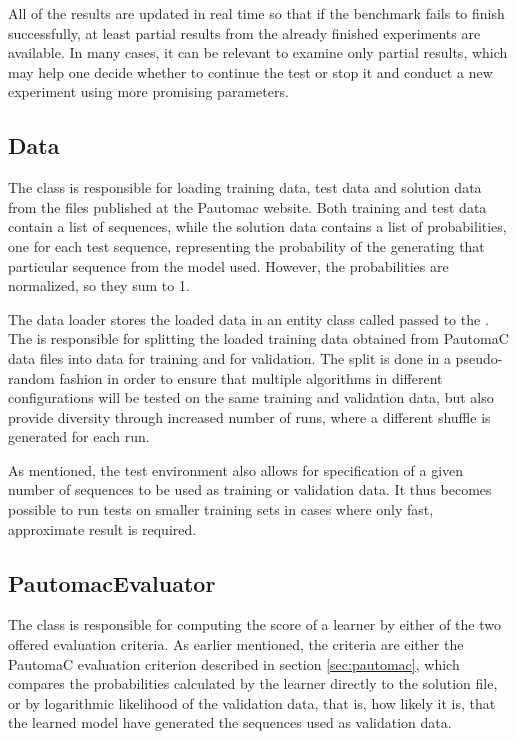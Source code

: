 All of the results are updated in real time so that if the benchmark fails to finish successfully, at least partial results from the already finished experiments are available. In many cases, it can be relevant to examine only partial results, which may help one decide whether to continue the test or stop it and conduct a new experiment using more promising parameters.

\subsection{Data}
The  class is responsible for loading training data, test data and solution data from the files published at the Pautomac website. Both training and test data contain a list of sequences, while the solution data contains a list of probabilities, one for each test sequence, representing the probability of the generating that particular sequence from the model used. However, the probabilities are normalized, so they sum to 1.

The data loader stores the loaded data in an entity class called  passed to the . The  is responsible for splitting the loaded training data obtained from PautomaC data files into data for training and for validation. The split is done in a pseudo-random fashion in order to ensure that multiple algorithms in different configurations will be tested on the same training and validation data, but also provide diversity through increased number of runs, where a different shuffle is generated for each run.

As mentioned, the test environment also allows for specification of a given number of sequences to be used as training or validation data. It thus becomes possible to run tests on smaller training sets in cases where only fast, approximate result is required.

\subsection{PautomacEvaluator}
The  class is responsible for computing the score of a learner by either of the two offered evaluation criteria. As earlier mentioned, the criteria are either the PautomaC evaluation criterion described in section \ref{sec:pautomac}, which compares the probabilities calculated by the learner directly to the solution file, or by logarithmic likelihood of the validation data, that is, how likely it is, that the learned model have generated the sequences used as validation data.


